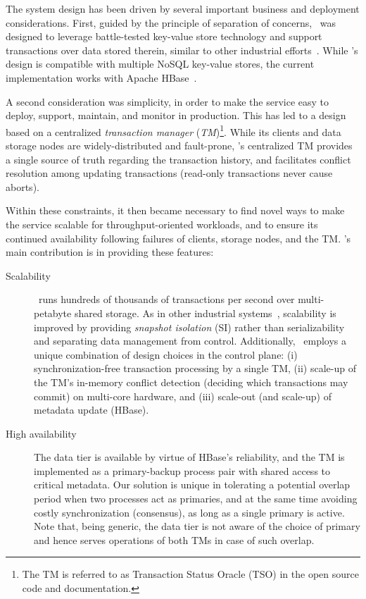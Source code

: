 The system design has been driven by several important business and deployment considerations. 
First, 
guided by the principle of separation of concerns, \sys\ was designed to leverage  
battle-tested key-value store 
technology and support transactions over data stored therein, similar to other industrial 
efforts~\cite{Tephra, Percolator2010, Spanner2012}.
While \sys's design is  compatible with multiple NoSQL key-value stores,
the current implementation 
works with Apache HBase~\cite{hbase}. 

A second consideration was  simplicity, in order to make the service easy to deploy, support, 
maintain, and monitor in production. This has led to a design based on a centralized \emph{transaction manager} ({\em TM})\footnote{\small{The TM is referred to as Transaction Status Oracle (TSO) in the open source code and documentation.}}.
While its clients and data storage nodes are  widely-distributed and fault-prone, 
\sys's centralized TM provides a single source of truth regarding the transaction history, and facilitates
conflict resolution among updating transactions (read-only transactions never cause aborts).

Within these constraints, it then became necessary to find novel ways to make the service scalable for throughput-oriented workloads,
and to ensure its continued availability  following failures of clients, storage nodes, and the TM. 
\sys's main contribution is in providing these features:
\begin{description}
\item[Scalability]
\sys\ runs hundreds of thousands of transactions per second over multi-petabyte shared storage.
As in other industrial systems~\cite{Percolator2010,OmidICDE2014,Tephra}, scalability is improved by
providing {\em snapshot isolation\/} (SI) rather than serializability~\cite{Gray:1992:TPC:573304} and separating 
data management from control. Additionally, \sys\ employs a unique combination of design choices in the control plane:
(i) synchronization-free transaction processing by a single TM, 
(ii) scale-up of the TM's in-memory conflict detection 
(deciding which transactions may commit) on multi-core hardware, 
and
(iii) scale-out (and scale-up) of metadata update (HBase).
\item[High availability]
The data tier is available by virtue of HBase's reliability, and the TM is implemented as a primary-backup process pair with shared access to critical 
metadata. 
Our solution is unique in 
tolerating a potential overlap period when two processes act as primaries,  and
at the same time avoiding costly synchronization (consensus), as long as a single primary is active. 
Note that, being generic, the data tier is not aware of the choice of primary and hence serves operations of both TMs in case of such overlap.
\end{description}

